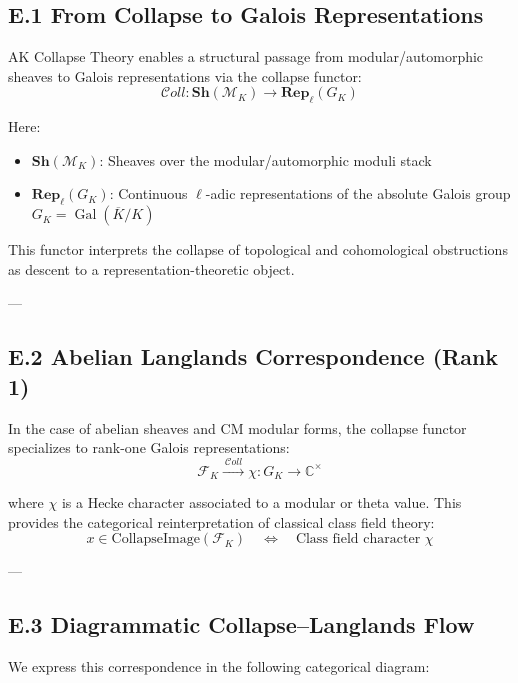 \documentclass[11pt]{article}
\begin{document}
\subsection*{E.1 From Collapse to Galois Representations}

AK Collapse Theory enables a structural passage from modular/automorphic sheaves to Galois representations via the collapse functor:
\[
\mathcal{C}oll : \mathbf{Sh}(\mathcal{M}_K) \longrightarrow \mathbf{Rep}_{\ell}(G_K)
\]

Here:
\begin{itemize}
    \item \( \mathbf{Sh}(\mathcal{M}_K) \): Sheaves over the modular/automorphic moduli stack
    \item \( \mathbf{Rep}_{\ell}(G_K) \): Continuous \( \ell \)-adic representations of the absolute Galois group \( G_K = \operatorname{Gal}(\overline{K}/K) \)
\end{itemize}

This functor interprets the collapse of topological and cohomological obstructions as descent to a representation-theoretic object.

---

\subsection*{E.2 Abelian Langlands Correspondence (Rank 1)}

In the case of abelian sheaves and CM modular forms, the collapse functor specializes to rank-one Galois representations:
\[
\mathcal{F}_K \xrightarrow{\ \mathcal{C}oll\ } \chi: G_K \longrightarrow \mathbb{C}^\times
\]

where \( \chi \) is a Hecke character associated to a modular or theta value. This provides the categorical reinterpretation of classical class field theory:
\[
x \in \text{CollapseImage}(\mathcal{F}_K) \quad \Leftrightarrow \quad \text{Class field character } \chi
\]

---

\subsection*{E.3 Diagrammatic Collapse–Langlands Flow}

We express this correspondence in the following categorical diagram:

\begin{center}
\end{center}
\end{document}
